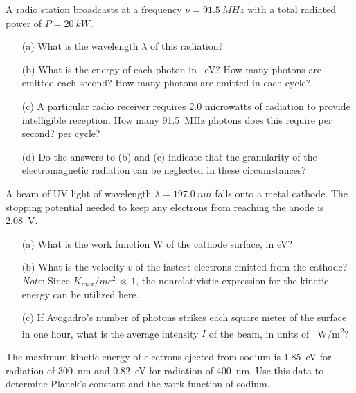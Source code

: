 \documentclass[12pt,letterpaper,boxed,cm]{hmcpset}
\begin{document}

\begin{problem}[Townsend 1.4]
	A radio station broadcasts at a frequency $\nu =
\SI{91.5}{MHz}$ with a total radiated power of $P = \SI{20}{kW}$.
	\begin{enumerate}
		\item[(a)] What is the wavelength $\lambda$ of this radiation? 
		\item[(b)] What is the energy of each photon in \SI{}{eV}? How many photons are emitted each second? How many photons are emitted in each cycle? 
		\item[(c)] A particular radio receiver requires 2.0 microwatts of radiation to provide intelligible reception. How many \SI{91.5}{MHz} photons does this	 require per second? per cycle?
		\item[(d)] Do the answers to (b) and (c) indicate that the granularity of the electromagnetic radiation can be neglected in these circumstances?
	\end{enumerate}
\end{problem}
\begin{solution}
\end{solution}
\newpage

\begin{problem}[Townsend 1.9]
	A beam of UV light of wavelength $\lambda = \SI{197.0}{nm}$ falls onto a metal cathode. The stopping potential needed to keep any electrons from reaching the anode is \SI{2.08}{V}. 
	\begin{enumerate}
		\item[(a)] What is the work function W of the cathode surface, in eV? 
		\item[(b)] What is the velocity $v$ of the fastest electrons emitted from the cathode? \textit{Note}: Since $K_{\text{max}}/mc^2 \ll 1$, the nonrelativistic expression for the kinetic energy can be utilized here. 
		\item[(c)] If Avogadro's number of photons strikes each square meter of the surface in one hour, what is the average intensity $I$ of the beam, in units of \SI{}{W/m^2}?
	\end{enumerate}
\end{problem}
\begin{solution}
\end{solution}
\newpage

\begin{problem}[Townsend 1.13]
	 The maximum kinetic energy of electrons ejected from sodium is \SI{1.85}{eV} for radiation of \SI{300}{nm} and \SI{0.82}{eV} for radiation of \SI{400}{nm}. Use this data to determine Planck's constant and the work function of sodium.
\end{problem}
\begin{solution}
\end{solution}
\end{document}
